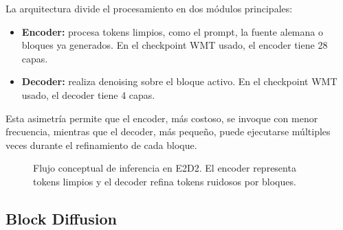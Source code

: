 \documentclass[conference]{IEEEtran}
\begin{document}
La arquitectura divide el procesamiento en dos módulos principales:

\begin{itemize}
    \item \textbf{Encoder:} procesa tokens limpios, como el prompt, la fuente alemana o bloques ya generados. En el checkpoint WMT usado, el encoder tiene 28 capas.
    \item \textbf{Decoder:} realiza denoising sobre el bloque activo. En el checkpoint WMT usado, el decoder tiene 4 capas.
\end{itemize}

Esta asimetría permite que el encoder, más costoso, se invoque con menor frecuencia, mientras que el decoder, más pequeño, puede ejecutarse múltiples veces durante el refinamiento de cada bloque.

\begin{figure}[htbp]
\centering
{}
\caption{Flujo conceptual de inferencia en E2D2. El encoder representa tokens limpios y el decoder refina tokens ruidosos por bloques.}
\label{fig:e2d2_diagrama}
\end{figure}

\subsection{Block Diffusion}
\end{document}
